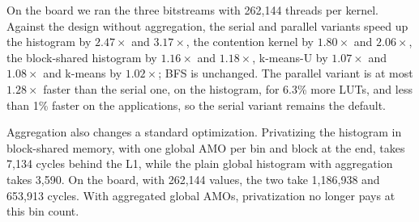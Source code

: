 \documentclass[journal]{IEEEtran}
\begin{document}
On the board we ran the three bitstreams with 262,144 threads per kernel. Against
the design without aggregation, the serial and parallel variants speed up the
histogram by $2.47\times$ and $3.17\times$, the contention kernel by $1.80\times$
and $2.06\times$, the block-shared histogram by $1.16\times$ and $1.18\times$,
k-means-U by $1.07\times$ and $1.08\times$ and k-means by $1.02\times$; BFS is
unchanged. The parallel variant is at most $1.28\times$ faster than the serial
one, on the histogram, for 6.3\% more LUTs, and less than 1\% faster on the
applications, so the serial variant remains the default.

Aggregation also changes a standard optimization. Privatizing the histogram in
block-shared memory, with one global AMO per bin and block at the end, takes 7,134
cycles behind the L1, while the plain global histogram with aggregation takes
3,590. On the board, with 262,144 values, the two take 1,186,938 and 653,913
cycles. With aggregated global AMOs, privatization no longer pays at this bin
count.
\end{document}
